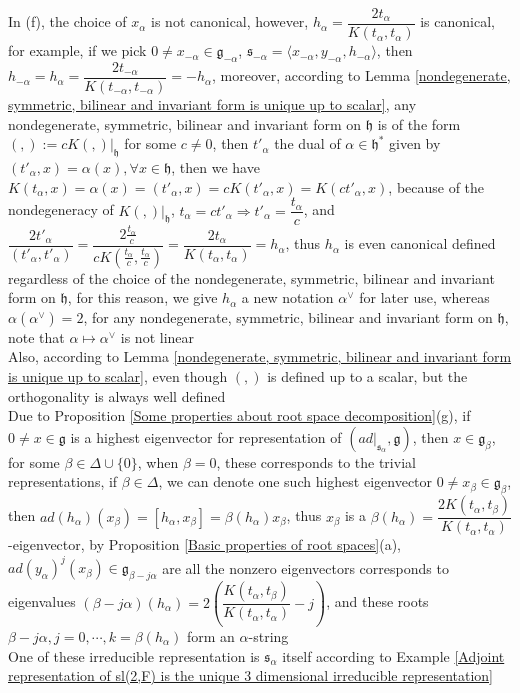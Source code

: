 \documentclass[main]{subfiles}
\begin{document}
\begin{remark}\label{alpha check is canonical}
In (f), the choice of $x_\alpha$ is not canonical, however, $h_\alpha=\dfrac{2t_\alpha}{K(t_\alpha,t_\alpha)}$ is canonical, for example, if we pick $0\neq x_{-\alpha}\in\mathfrak{g}_{-\alpha}$, $\mathfrak{s}_{-\alpha}=\langle x_{-\alpha},y_{-\alpha},h_{-\alpha}\rangle$, then $h_{-\alpha}=h_\alpha=\dfrac{2t_{-\alpha}}{K(t_{-\alpha},t_{-\alpha})}=-h_\alpha$, moreover, according to Lemma \ref{nondegenerate, symmetric, bilinear and invariant form is unique up to scalar}, any nondegenerate, symmetric, bilinear and invariant form on $\mathfrak{h}$ is of the form $(,):=cK(,)|_{\mathfrak{h}}$ for some $c\neq0$, then $t'_\alpha$ the dual of $\alpha\in\mathfrak{h}^*$ given by $(t'_\alpha,x)=\alpha(x),\forall x\in\mathfrak{h}$, then we have $K(t_\alpha,x)=\alpha(x)=(t'_\alpha,x)=cK(t'_\alpha,x)=K(ct'_\alpha,x)$, because of the nondegeneracy of $K(,)|_{\mathfrak{h}}$, $t_\alpha=ct'_\alpha\Rightarrow t'_\alpha=\dfrac{t_\alpha}{c}$, and $\dfrac{2t'_\alpha}{(t'_\alpha,t'_\alpha)}=\dfrac{2\frac{t_\alpha}{c}}{cK\left(\frac{t_\alpha}{c},\frac{t_\alpha}{c}\right)}=\dfrac{2t_\alpha}{K(t_\alpha,t_\alpha)}=h_\alpha$, thus $h_\alpha$ is even canonical defined regardless of the choice of the nondegenerate, symmetric, bilinear and invariant form on $\mathfrak{h}$, for this reason, we give $h_\alpha$ a new notation $\alpha^\vee$ for later use, whereas $\alpha(\alpha^\vee)=2$, for any nondegenerate, symmetric, bilinear and invariant form on $\mathfrak{h}$, note that $\alpha\mapsto\alpha^\vee$ is not linear \\
Also, according to Lemma \ref{nondegenerate, symmetric, bilinear and invariant form is unique up to scalar}, even though $(,)$ is defined up to a scalar, but the orthogonality is always well defined \\
Due to Proposition \ref{Some properties about root space decomposition}(g), if $0\neq x\in\mathfrak{g}$ is a highest eigenvector for representation of $(ad|_{\mathfrak{s}_\alpha},\mathfrak{g})$, then $x\in\mathfrak{g}_\beta$, for some $\beta\in\Delta\cup\{0\}$, when $\beta=0$, these corresponds to the trivial representations, if $\beta\in\Delta$, we can denote one such highest eigenvector $0\neq x_\beta\in\mathfrak{g}_\beta$, then $ad(h_\alpha)(x_\beta)=[h_\alpha,x_\beta]=\beta(h_\alpha)x_\beta$, thus $x_\beta$ is a $\beta(h_\alpha)=\dfrac{2K(t_\alpha,t_\beta)}{K(t_\alpha,t_\alpha)}$-eigenvector, by Proposition \ref{Basic properties of root spaces}(a), $ad(y_\alpha)^j(x_\beta)\in\mathfrak{g}_{\beta-j\alpha}$ are all the nonzero eigenvectors corresponds to eigenvalues $(\beta-j\alpha)(h_\alpha)=2\left(\dfrac{K(t_\alpha,t_\beta)}{K(t_\alpha,t_\alpha)}-j\right)$, and these roots $\beta-j\alpha,j=0,\cdots,k=\beta(h_\alpha
)$ form an $\alpha$-string \\
One of these irreducible representation is $\mathfrak{s}_\alpha$ itself according to Example \ref{Adjoint representation of sl(2,F) is the unique 3 dimensional irreducible representation}
\end{remark}
\end{document}
